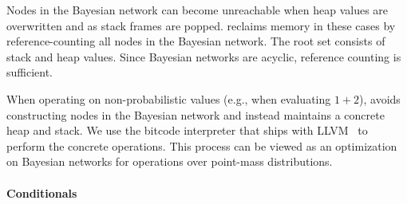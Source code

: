 Nodes in the Bayesian network can become unreachable when heap values are
overwritten and as stack frames are popped.
\tool reclaims memory in these cases by reference-counting all nodes in the
Bayesian network.
The root set consists of stack and heap values.
Since Bayesian networks are acyclic, reference counting is sufficient.

When operating on non-probabilistic values (e.g., when evaluating $1 + 2$),
\tool avoids constructing nodes in the Bayesian network and instead maintains
a concrete heap and stack. We use the
bitcode interpreter that ships with LLVM~\cite{llvminterp} to perform
the concrete operations.
This process can be viewed as an optimization on Bayesian networks for
operations over point-mass distributions.



\begin{table}[t!]
    \centering
    \footnotesize
    \caption{
        Programs used in the evaluation.
        The \passert for each application describes a probabilistic
        correctness property.
        The \emph{time} columns indicate the time taken by the baseline
        stress-testing strategy, \tool's analysis, and \tool's sampling step.
        The \emph{optimization counts} reflect the three categories of
        optimizations applied by \tool: arithmetic identities (Arith), operations on
        known closed-form distributions (Dist Op), and the Central Limit
        Theorem optimization (CLT).
    }
    \label{passert:table:apps}
\end{table}

\paragraph{Conditionals}

